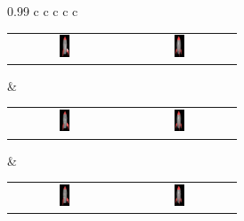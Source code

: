 \begin{figure}[!htb]
\begin{tabular*}{0.99\textwidth}{ c c c c c }
        
        \setlength\tabcolsep{0pt}
        \begin{tabular}{cc}
            \includegraphics[width=0.095\textwidth]{figures/results/col_set/rocket0_targ_256px.png} & \includegraphics[width=0.095\textwidth]{figures/results/col_set/rocket4_targ_256px.png}
        \end{tabular}
        &
        \setlength\tabcolsep{0pt}
        \begin{tabular}{cc}
            \includegraphics[width=0.095\textwidth]{figures/results/col_set/rocket0_imnf_44k.png} & \includegraphics[width=0.095\textwidth]{figures/results/col_set/rocket4_imnf_44k.png}
        \end{tabular}
        &
        \setlength\tabcolsep{0pt}
        \begin{tabular}{cc}
            \includegraphics[width=0.095\textwidth]{figures/results/col_set/rocket0_excol_150k.png} & \includegraphics[width=0.095\textwidth]{figures/results/col_set/rocket4_excol_150k.png}

\end{tabular}
\end{tabular*}
\end{figure}
